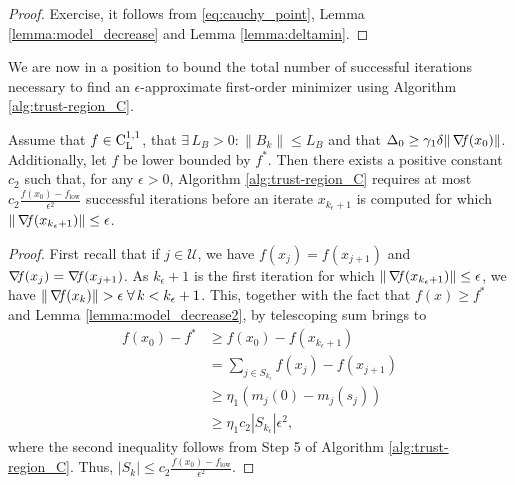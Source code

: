 \documentclass[10pt,a4paper]{article}
\begin{document}
\begin{proof}
	Exercise, it follows from \eqref{eq:cauchy_point}, Lemma \ref{lemma:model_decrease} and Lemma \ref{lemma:deltamin}.
\end{proof}

\noindent We are now in a position to bound the total number of successful iterations necessary to find an $\epsilon$-approximate first-order minimizer using Algorithm \ref{alg:trust-region_C}.

\begin{lemma}
	Assume that $f\in \mathord{\mathrm{C^{1,1}_{L}}}$, that $\exists\, L_B>0: \|B_k\| \leq L_B$ and that $\Delta_0\geq \gamma_1 \delta \|\operatorname*{\mathit{\nabla \!f}}(x_0)\|$. Additionally, let $f$ be lower bounded by $f^*$. Then there exists a positive constant $c_2$ such that, for any $\epsilon > 0$, Algorithm \ref{alg:trust-region_C} requires at most $c_2 \frac{f(x_0) - f_{\text{low}}}{\epsilon^2}$
	successful iterations before an iterate $x_{k_\epsilon+1}$ is computed for which $\|\operatorname*{\mathit{\nabla \!f}}(x_{k_\epsilon+1})\| \leq \epsilon$.
\end{lemma}
\begin{proof}
First recall that if $j\in \mathcal{U}$, we have $f(x_j) = f(x_{j+1})$ and $\operatorname*{\mathit{\nabla \!f}}(x_j)=\operatorname*{\mathit{\nabla \!f}}(x_{j+1})$. As $k_\epsilon+1$ is the first iteration for which $\|\operatorname*{\mathit{\nabla \!f}}(x_{k_\epsilon+1})\| \leq \epsilon$, we have $\|\grad(x_k)\|>\epsilon \; \forall \, k <k_\epsilon+1$. This, together with the fact that $f(x)\geq f^*$ and Lemma \ref{lemma:model_decrease2}, by telescoping sum brings to 
\begin{align*}
	f(x_0)-f^* &\geq f(x_0) - f(x_{k_\epsilon+1})\\
	& =\sum_{j\in S_{k_\epsilon}} f(x_j) - f(x_{j+1})\\
	& \geq \eta_1 (m_j(0)- m_j(s_j))\\
	& \geq \eta_1 c_2 |S_{k_\epsilon}| \epsilon^2,
\end{align*}
where the second inequality follows from Step 5 of Algorithm \ref{alg:trust-region_C}. Thus, $|S_k|\leq c_2 \frac{f(x_0) - f_{\text{low}}}{\epsilon^2}.$
\end{proof}
\end{document}
